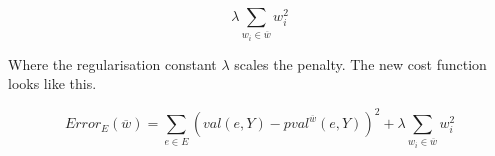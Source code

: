 
\[ \lambda \sum_{w_i \in \overline{w}} w_i^2 \]

Where the regularisation constant $\lambda$ scales the penalty. 
The new cost function looks like this.

\[ Error_E(\overline{w}) = \sum_{e \in E} \left(val(e,Y) - pval^{\overline{w}}(e,Y)\right)^2 + \lambda \sum_{w_i \in \overline{w}} w_i^2 \]


\begin{flushright}
\cite[online course]{courseraAI}
\end{flushright}














